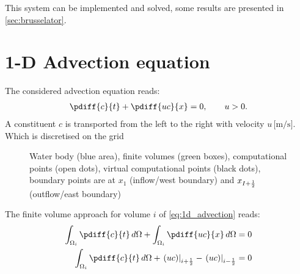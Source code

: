 This system can be implemented and solved, some results are presented in \autoref{sec:brusselator}.
%
\section{1-D Advection equation}\label{sec:1d_advection_equation}
The considered advection equation reads:
\begin{align}
    \pdiff{c}{t} + \pdiff{uc}{x} = 0, \qquad u>0. \label{eq:1d_advection}
\end{align}
A constituent $c$ is transported from the left to the right with  velocity $u\, \si{[\meter\per\second]}$.
Which is discretised on the grid
\begin{figure}[H]
    \centering
    \begin{center}
        \resizebox{0.8\textwidth}{!}{
            
        }
    \end{center}
    \caption[Definition of the grid to solve the 1D-advection equation]{Water body (blue area), finite volumes (green boxes), computational points (open dots), virtual computational points (black dots), boundary points are at $x_{1}$ (inflow/west boundary) and $x_{I+\frac{1}{2}}$ (outflow/east boundary)}\label{fig:water_body_fve_bc_at_node_1}
\end{figure}
The finite volume approach for volume $i$ of \autoref{eq:1d_advection} reads:
\begin{align}
    \int_{\Omega_i} \pdiff{c}{t}\, d\Omega + \int_{\Omega_i} \pdiff{uc}{x} \, d\Omega = 0
    \\
    \int_{\Omega_i} \pdiff{c}{t}\, d\Omega + \left. (uc) \right|_{i+\half} -  \left. (uc) \right|_{i-\half} = 0
\end{align}

